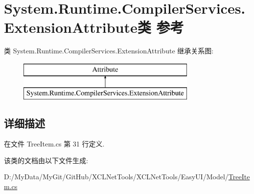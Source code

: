 \hypertarget{class_system_1_1_runtime_1_1_compiler_services_1_1_extension_attribute}{\section{System.\-Runtime.\-Compiler\-Services.\-Extension\-Attribute类 参考}
\label{class_system_1_1_runtime_1_1_compiler_services_1_1_extension_attribute}
}
类 System.\-Runtime.\-Compiler\-Services.\-Extension\-Attribute 继承关系图\-:\begin{figure}[H]
\begin{center}
\leavevmode
\includegraphics[height=2.000000cm]{class_system_1_1_runtime_1_1_compiler_services_1_1_extension_attribute}
\end{center}
\end{figure}


\subsection{详细描述}


在文件 Tree\-Item.\-cs 第 31 行定义.



该类的文档由以下文件生成\-:\begin{DoxyCompactItemize}
\item 
D\-:/\-My\-Data/\-My\-Git/\-Git\-Hub/\-X\-C\-L\-Net\-Tools/\-X\-C\-L\-Net\-Tools/\-Easy\-U\-I/\-Model/\hyperlink{_tree_item_8cs}{Tree\-Item.\-cs}\end{DoxyCompactItemize}
